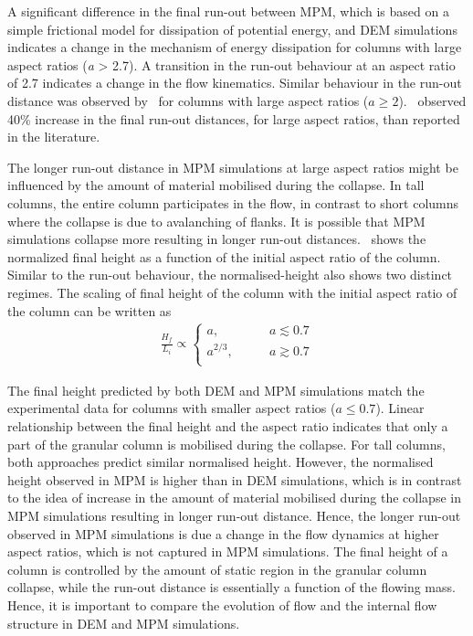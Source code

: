 A significant difference in the final run-out between MPM, which is based on a 
simple frictional model for dissipation of potential energy, and DEM 
simulations indicates a change in the mechanism of energy 
dissipation for columns with large aspect ratios (\textit{a} > 
2.7). A transition in the run-out behaviour at an aspect ratio of 2.7 indicates 
a change in the flow kinematics. Similar behaviour in the run-out distance was 
observed by~\citet{Bandara2013} for columns with large aspect ratios ($a \ge 
2$).~\citet{Mast2014} observed 40\% increase in the final run-out distances, 
for large aspect ratios, than reported in the literature.

The longer run-out distance in MPM simulations at large aspect ratios might be 
influenced by the amount of material mobilised during the collapse. In tall 
columns, the entire column participates in the flow, in contrast to short 
columns where the collapse is due to avalanching of 
flanks. It is possible that MPM simulations 
collapse more resulting in longer run-out distances.~ shows 
the normalized final height as a function of the initial aspect ratio of the 
column. Similar to the run-out behaviour, the normalised-height also shows two 
distinct regimes. The scaling of final height of the column with the initial 
aspect ratio of the column can be written as
\begin{align}
\frac{H_{\textit{f}}}{L_{\textit{i}}} \propto  
\begin{cases}
\textit{a}, \qquad & \textit{a}\lesssim0.7 \\
\textit{a}^{2/3}, \qquad & \textit{a}\gtrsim0.7 \\
\end{cases}
\end{align} 

The final height predicted by both DEM and MPM simulations match the 
experimental data for columns with smaller aspect ratios ($a \le 0.7$). Linear 
relationship between the final height and the aspect ratio indicates that only 
a part of the granular column is mobilised during the collapse. For tall 
columns, both approaches predict similar normalised height. However, the 
normalised height observed in MPM is higher than in DEM simulations, which is 
in contrast to the idea of increase in the amount of material mobilised during 
the collapse in MPM simulations resulting in longer run-out distance. Hence, 
the longer run-out observed in MPM simulations is due a change in the 
flow dynamics at higher aspect ratios, which is not captured in MPM 
simulations. The final height of a column is controlled by the amount of static 
region in the granular column collapse, while the run-out distance is 
essentially a function of the flowing mass. Hence, it is important to compare 
the evolution of flow and the internal flow structure in DEM and MPM 
simulations.

